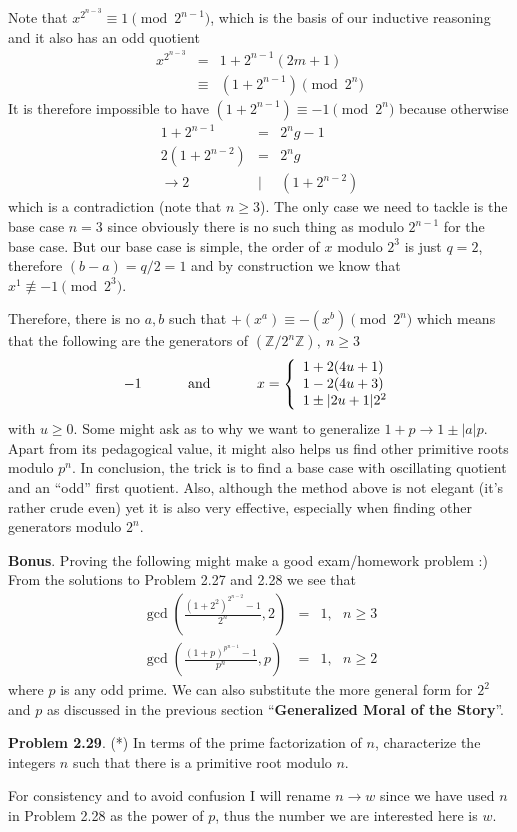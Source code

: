 \documentclass[aps,preprint,preprintnumbers,nofootinbib,showpacs,prd]{revtex4-1}
\newcommand{\ba}{\begin{array}}
\newcommand{\ea}{\end{array}}
\newcommand{\nbea}{\begin{eqnarray*}}
\newcommand{\neea}{\end{eqnarray*}}
\begin{document}
Note that $x^{2^{n-3}} \equiv 1 \pmod{2^{n-1}}$, which is the basis of our inductive reasoning and it also has an odd quotient
%
\nbea
x^{2^{n-3}} & = & 1 + 2^{n-1}(2m+1) \\
& \equiv & (1 + 2^{n-1}) \pmod{2^n}
\neea
%
It is therefore impossible to have $(1 + 2^{n-1}) \equiv -1 \pmod{2^n}$ because otherwise
%
\nbea
1 + 2^{n-1} & = & 2^n g - 1 \\
2(1 + 2^{n-2}) & = & 2^n g \\
\to 2 & | & (1 + 2^{n-2})
\neea
%
which is a contradiction (note that $n \ge 3$). The only case we need to tackle is the base case $n=3$ since obviously there is no such thing as modulo $2^{n-1}$ for the base case. But our base case is simple, the order of $x$ modulo $2^3$ is just $q = 2$, therefore $(b-a) = q/2 = 1$ and by construction we know that $x^1 \not\equiv -1 \pmod{2^3}$.

Therefore, there is no $a,b$ such that $+(x^a) \equiv -(x^b) \pmod{2^n}$ which means that the following are the generators of $(\mathbb{Z}/2^n\mathbb{Z}),~n \ge 3$
%
\nbea
-1 ~~~~~~~~~~{\rm and}~~~~~~~~~~
x =  \left \{ \ba{l}
1 + 2(4u+1)  \\
1 - 2(4u+3) \\
1 \pm |2u+1|2^2
\ea
\right.
\neea
%
with $u \ge 0$. Some might ask as to why we want to generalize $1 + p \to 1 \pm |a|p$. Apart from its pedagogical value, it might also helps us find other primitive roots modulo $p^n$. In conclusion, the trick is to find a base case with oscillating quotient and an ``odd'' first quotient. Also, although the method above is not elegant (it's rather crude even) yet it is also very effective, especially when finding other generators modulo $2^n$.

{\bf Bonus}. Proving the following might make a good exam/homework problem :) From the solutions to Problem 2.27 and 2.28 we see that
%
\nbea
\gcd\left( \frac{(1 + 2^2)^{2^{n-2}} - 1}{2^n}, 2 \right ) & = & 1, ~~~ n \ge 3 \\
\gcd\left( \frac{(1 + p)^{p^{n-1}} - 1}{p^n}, p \right ) & = & 1, ~~~ n \ge 2
\neea
%
where $p$ is any odd prime. We can also substitute the more general form for $2^2$ and $p$ as discussed in the previous section ``{\bf Generalized Moral of the Story}''.

{\bf Problem 2.29}. (*) In terms of the prime factorization of $n$, characterize the integers $n$ such that there is a primitive root modulo $n$.

For consistency and to avoid confusion I will rename $n \to w$ since we have used $n$ in Problem 2.28 as the power of $p$, thus the number we are interested here is $w$.
\end{document}
